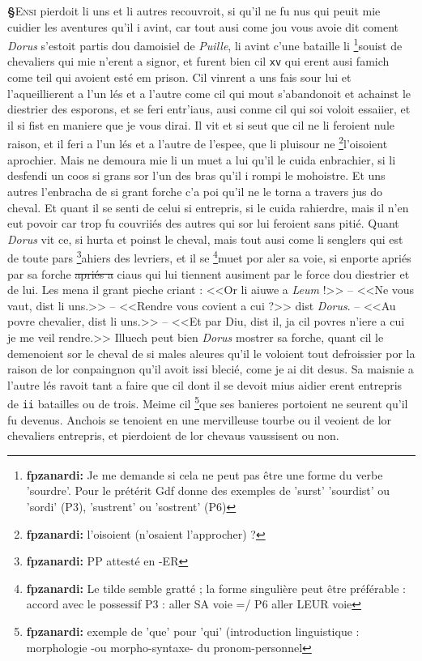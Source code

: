 \documentclass[12pt]{article} %
\newcommand{\colmar}[1]{\marginnote{[#1]}}          %
\newcommand{\persName}[1]{\emph{#1}} %
\newcommand{\placeName}[1]{\emph{#1}} %
\newcommand{\num}[1]{\texttt{#1}}    %
\newcommand{\supplied}[1]{\textlangle#1\textrangle} %
\newcommand{\fnfpz}[1]{\footnote{\textbf{fpzanardi:} #1}} %
\newcommand{\del}[1]{\sout{#1}}      %
\newcounter{paranum}
\newcommand{\pnum}{\stepcounter{paranum}\textbf{§\arabic{paranum}}\quad}
\begin{document}
\pnum \lettrine[lines=2]{\color{darkred}E}{nsi} pierdoit li uns et li autres recouvroit, si qu'il ne fu nus qui peuit mie cuidier les aventures qu'il i avint, car tout ausi come jou vous avoie dit coment \persName{Dorus} s'estoit partis dou damoisiel de \placeName{Puille}, li avint c'une bataille li \fnfpz{Je me demande si cela ne peut pas être une forme du verbe 'sourdre'. Pour le prétérit Gdf donne des exemples de 'surst' 'sourdist' ou 'sordi' (P3), 'sustrent' ou 'sostrent' (P6)}souist de chevaliers qui mie n'ere\supplied{n}t a signor, et furent bien cil \num{xv} qui erent ausi famich come teil qui avoient esté em prison. Cil vinrent a uns fais sour lui et l'aqueillierent a l'un lés et a l'autre come cil qui mout s'abandonoit \colmar{7rb}\colmar{b} et achainst le diestrier des esporons, et se feri entr'iaus, ausi conme cil qui soi voloit essaiier, et il si fist en maniere que je vous dirai. Il vit et si seut que cil ne li feroient nule raison, et il feri a l'un lés et a l'autre de l'espee, que li pluisour ne \fnfpz{l'oisoient (n'osaient l'approcher) ?}l'oisoient aprochier. Mais ne demoura mie li un muet a lui qu'il le cuida enbrachier, si li desfendi un coos si grans sor l'un des bras qu'il i rompi le mohoistre. Et uns autres l'enbracha de si grant forche c'a poi qu'il ne le torna a travers jus do cheval. Et quant il se senti de celui si entrepris, si le cuida rahierdre, mais il n'en eut povoir car trop fu couvriiés des autres qui sor lui feroient sans pitié. Quant \persName{Dorus} vit ce, si hurta et poinst le cheval, mais tout ausi come li senglers qui est de toute pars \fnfpz{PP attesté en -ER}ahiers des levriers, et il se \fnfpz{Le tilde semble gratté ; la forme singulière peut être préférable : accord avec le possessif P3 : aller SA voie =/ P6 aller LEUR voie}muet por aler sa voie, si enporte apriés par sa forche \del{apriés a} ciaus qui lui tiennent ausiment par le force dou diestrier et de lui. Les mena il grant pieche criant : <<Or li aiuwe a \persName{Leum} !>> -- <<Ne vous vaut, dist li uns.>> -- <<Rendre vous covient a cui ?>> dist \persName{Dorus}. -- <<Au povre chevalier, dist li uns.>> -- <<Et par Diu, dist il, ja cil povres n'iere a cui je me veil rendre.>> Illuech peut bien \persName{Dorus} mostrer sa forche, quant cil le demenoient sor le cheval de si males aleures qu'il le voloient tout defroissier por la raison de lor conpaingnon qu'il avoit issi blecié, come je ai dit desus. Sa maisnie a l'autre lés ravoit tant a faire que cil dont il se devoit mius aidier erent entrepris de \num{ii} batailles ou de trois. Meime cil \fnfpz{exemple de 'que' pour 'qui' (introduction linguistique : morphologie -ou morpho-syntaxe- du pronom-personnel}que ses banieres portoient ne seurent qu'il fu devenus. Anchois se tenoient en une mervilleuse tourbe ou il veoient de lor chevaliers entrepris, et pierdoient de lor chevaus vaussisent ou non.
\end{document}
